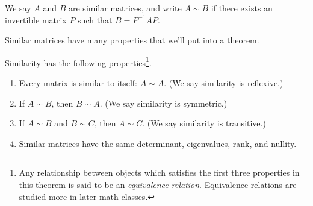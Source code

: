\begin{definition} We say $A$ and $B$ are similar matrices, and write $A\sim B$ if there exists an invertible matrix $P$ such that $B=P^{-1}AP$.  \end{definition}

Similar matrices have many properties that we'll put into a theorem. 

\begin{theorem} Similarity has the following properties\footnote{Any relationship between objects which satisfies the first three properties in this theorem is said to be an \emph{equivalence relation}.  Equivalence relations are studied more in later math classes.}.

\begin{enumerate}
	\item Every matrix is similar to itself: $A\sim A$. (We say similarity is reflexive.)
	\item If $A\sim B$, then $B\sim A$. (We say similarity is symmetric.)
	\item If $A\sim B$ and $B\sim C$, then $A\sim C$. (We say similarity is transitive.)
	\item Similar matrices have the same determinant, eigenvalues, rank, and nullity.
\end{enumerate}
\end{theorem}
